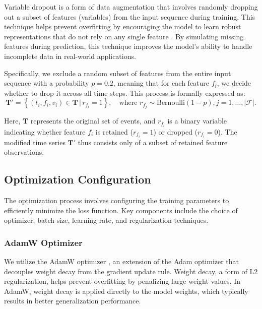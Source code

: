 Variable dropout is a form of data augmentation that involves randomly dropping out a subset of features (variables) from the input sequence during training. This technique helps prevent overfitting by encouraging the model to learn robust representations that do not rely on any single feature \cite{DropoutSimpleWay2014}. By simulating missing features during prediction, this technique improves the model's ability to handle incomplete data in real-world applications.

Specifically, we exclude a random subset of features from the entire input sequence with a probability \(p = 0.2\), meaning that for each feature \(f_i\), we decide whether to drop it across all time steps. This process is formally expressed as:
\begin{equation}
    \label{eq:variable_dropout}
    \mathbf{T}' = \left\{ (t_i, f_i, v_i) \in \mathbf{T} \,\big|\, r_{f_i} = 1 \right\}, \quad \text{where } r_{f_j} \sim \text{Bernoulli}(1 - p), j = 1, \dots, |\mathcal{F}|.
\end{equation}

Here, \(\mathbf{T}\) represents the original set of events, and \(r_{f_i}\) is a binary variable indicating whether feature \(f_i\) is retained (\(r_{f_i} = 1\)) or dropped (\(r_{f_i} = 0\)). The modified time series  \(\mathbf{T}'\) thus consists only of a subset of retained feature observations.

\subsection{Optimization Configuration}

The optimization process involves configuring the training parameters to efficiently minimize the loss function. Key components include the choice of optimizer, batch size, learning rate, and regularization techniques.

\subsubsection{AdamW Optimizer}

We utilize the AdamW optimizer \cite{DecoupledWeightDecay2019}, an extension of the Adam optimizer that decouples weight decay from the gradient update rule. Weight decay, a form of L2 regularization, helps prevent overfitting by penalizing large weight values. In AdamW, weight decay is applied directly to the model weights, which typically results in better generalization performance.


